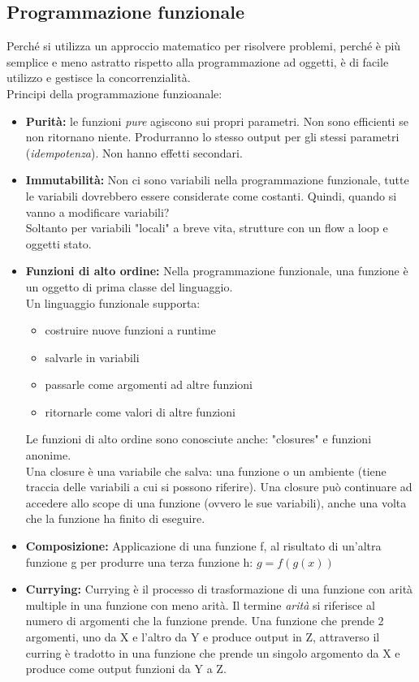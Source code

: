 \documentclass{article}
\begin{document}
\begin{appendices}
\subsection{Programmazione funzionale}
Perché si utilizza un approccio matematico per risolvere problemi, perché è più semplice e meno astratto rispetto alla programmazione ad oggetti, è di facile utilizzo e gestisce la concorrenzialità. \\
Principi della programmazione funzioanale:
\begin{itemize}
    \item \textbf{Purità:} le funzioni \textit{pure} agiscono sui propri parametri. Non sono efficienti se non ritornano niente. Produrranno lo stesso output per gli stessi parametri (\textit{idempotenza}). Non hanno effetti secondari.
    \item \textbf{Immutabilità:} Non ci sono variabili nella programmazione funzionale, tutte le variabili dovrebbero essere considerate come costanti. Quindi, quando si vanno a modificare variabili? \\
    Soltanto per variabili "locali" a breve vita, strutture con un flow a loop e oggetti stato.
    \item \textbf{Funzioni di alto ordine:} Nella programmazione funzionale, una funzione è un oggetto di prima classe del linguaggio. \\
    Un linguaggio funzionale supporta:
    \begin{itemize}
        \item costruire nuove funzioni a runtime
        \item salvarle in variabili
        \item passarle come argomenti ad altre funzioni
        \item ritornarle come valori di altre funzioni
    \end{itemize}
    Le funzioni di alto ordine sono conosciute anche: "closures" e funzioni anonime. \\
    Una closure è una variabile che salva: una funzione o un ambiente (tiene traccia delle variabili a cui si possono riferire). Una closure può continuare ad accedere allo scope di una funzione (ovvero le sue variabili), anche una volta che la funzione ha finito di eseguire.
    \item \textbf{Composizione:} Applicazione di una funzione f, al risultato di un'altra funzione g per produrre una terza funzione h: $g = f(g(x))$
    \item \textbf{Currying:} Currying è il processo di trasformazione di una funzione con arità multiple in una funzione con meno arità. Il termine \textit{arità} si riferisce al numero di argomenti che la funzione prende. Una funzione che prende 2 argomenti, uno da X e l'altro da Y e produce output in Z, attraverso il curring è tradotto in una funzione che prende un singolo argomento da X e produce come output funzioni da Y a Z.
\end{itemize}


\end{appendices}
\end{document}
